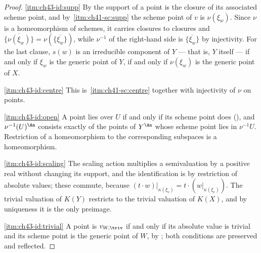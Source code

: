 \begin{proof}
\cref{itm:ch43-id:supp} By  the support of a point
is the closure of its associated scheme point, and by
\,\cref{itm:ch41-sc:supp} the scheme
point of $v$ is $\nu(\xi_w)$.  Since $\nu$ is a homeomorphism of
schemes, it carries closures to closures and
$\overline{\{\nu(\xi_w)\}}=\nu(\overline{\{\xi_w\}})$, while
$\nu^{-1}$ of the right-hand side is $\overline{\{\xi_w\}}$ by
injectivity.  For the last clause, $s(w)$ is an irreducible component of
$Y$ --- that is, $Y$ itself --- if and only if $\xi_w$ is the generic
point of $Y$, if and only if $\nu(\xi_w)$ is the generic point of $X$.

\cref{itm:ch43-id:centre} This is
\,\cref{itm:ch41-sc:centre} together
with injectivity of $\nu$ on points.

\cref{itm:ch43-id:open} A point lies over $U$ if and only if its scheme
point does (), and
$\nu^{-1}(U)^{\An}$ consists exactly of the points of $Y^{\An}$ whose
scheme point lies in $\nu^{-1}U$.  Restriction of a homeomorphism to the corresponding subspaces is a
homeomorphism.

\cref{itm:ch43-id:scaling} The scaling action multiplies a semivaluation by a
positive real without changing its support, and the identification is by
restriction of absolute values; these commute, because
$(t\cdot w)|_{\kappa(\xi_v)}=t\cdot(w|_{\kappa(\xi_v)})$.  The trivial
valuation of $K(Y)$ restricts to the trivial valuation of $K(X)$, and by
uniqueness it is the only preimage.

\cref{itm:ch43-id:trivial} A point is $v_{W,\triv}$ if and only if its
absolute value is trivial and its scheme point is the generic point of
$W$, by ; both conditions are preserved and
reflected.
\end{proof}

